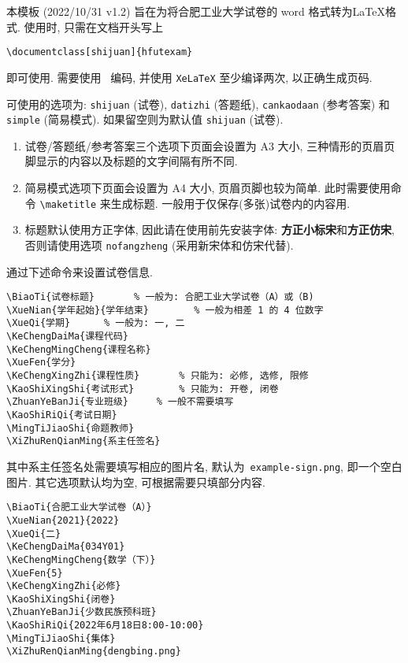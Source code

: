 \documentclass{hfutexam}
\begin{document}



\indent
本模板 (2022/10/31 v1.2) 旨在为将合肥工业大学试卷的 word 格式转为\LaTeX{}格式.
使用时, 只需在文档开头写上
\begin{lstlisting}
\documentclass[shijuan]{hfutexam}
\end{lstlisting}
即可使用.
需要使用~{\color{blue}{\lstinline|UTF-8|}} 编码, 并使用 \lstinline|XeLaTeX| 至少编译两次, 以正确生成页码.

\indent
可使用的选项为: \lstinline|shijuan| (试卷), \lstinline|datizhi| (答题纸), \lstinline|cankaodaan| (参考答案) 和 \lstinline|simple| (简易模式). 如果留空则为默认值 \lstinline|shijuan| (试卷).
\begin{enumerate}
\item 试卷/答题纸/参考答案三个选项下页面会设置为 A3 大小, 三种情形的页眉页脚显示的内容以及标题的文字间隔有所不同.
\item 简易模式选项下页面会设置为 A4 大小, 页眉页脚也较为简单. 此时需要使用命令 \lstinline|\maketitle| 来生成标题.
一般用于仅保存(多张)试卷内的内容用.
\item 标题默认使用方正字体, 因此请在使用前先安装字体: {\bfseries\titlesongti 方正小标宋}和{\bfseries\titlefangsong 方正仿宋}, 否则请使用选项 \lstinline|nofangzheng| (采用新宋体和仿宋代替).
\end{enumerate}


\indent
通过下述命令来设置试卷信息.
\begin{lstlisting}
\BiaoTi{试卷标题}		% 一般为: 合肥工业大学试卷（A）或（B)
\XueNian{学年起始}{学年结束}		% 一般为相差 1 的 4 位数字
\XueQi{学期}		% 一般为: 一, 二
\KeChengDaiMa{课程代码}
\KeChengMingCheng{课程名称}
\XueFen{学分}
\KeChengXingZhi{课程性质}		% 只能为: 必修, 选修, 限修
\KaoShiXingShi{考试形式}		% 只能为: 开卷, 闭卷
\ZhuanYeBanJi{专业班级}		% 一般不需要填写
\KaoShiRiQi{考试日期}
\MingTiJiaoShi{命题教师}
\XiZhuRenQianMing{系主任签名} 
\end{lstlisting}
其中系主任签名处需要填写相应的图片名, 默认为~{\color{blue}\lstinline|example-sign.png|}, 即一个空白图片. 其它选项默认均为空, 可根据需要只填部分内容.
\newpage
\textit{\color{blue}{示例:}}
\begin{lstlisting}
\BiaoTi{合肥工业大学试卷（A）}
\XueNian{2021}{2022}
\XueQi{二}
\KeChengDaiMa{034Y01}
\KeChengMingCheng{数学（下）}
\XueFen{5}
\KeChengXingZhi{必修}
\KaoShiXingShi{闭卷}
\ZhuanYeBanJi{少数民族预科班}
\KaoShiRiQi{2022年6月18日8:00-10:00}
\MingTiJiaoShi{集体}
\XiZhuRenQianMing{dengbing.png}
\end{lstlisting}
\end{document}
